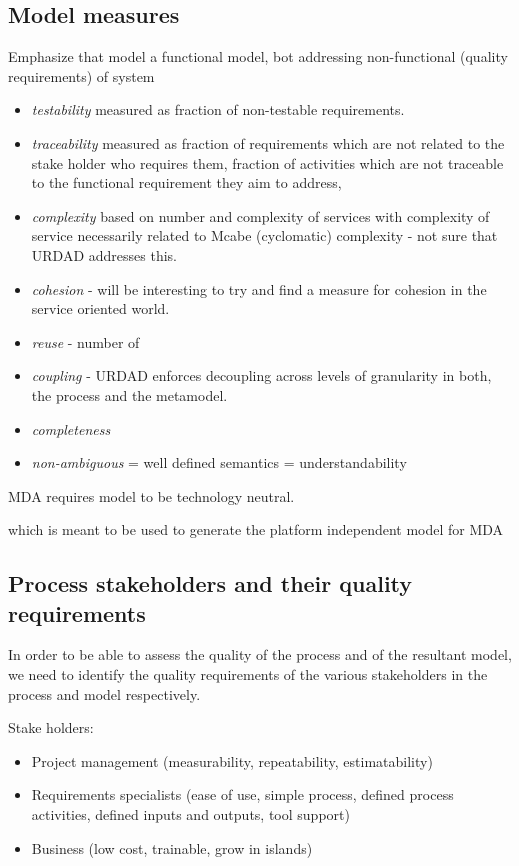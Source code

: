 \subsection{Model measures}
Emphasize that model a functional model, bot addressing non-functional (quality requirements) of system


\begin{itemize}
  \item \emph{testability} measured as fraction of non-testable requirements.
  \item \emph{traceability} measured as fraction of requirements which are not related to the stake holder who requires them, fraction of activities which are not traceable to the functional requirement they aim to address, 
  \item \emph{complexity} based on number and complexity of services with complexity of service necessarily related to Mcabe (cyclomatic) complexity - not sure that URDAD addresses this.
  \item \emph{cohesion} - will be interesting to try and find a measure for cohesion in the service oriented world.
  \item \emph{reuse} - number of
  \item \emph{coupling} - URDAD enforces decoupling across levels of granularity in both, the process and the metamodel.
  \item \emph{completeness}
  \item \emph{non-ambiguous} = well defined semantics = understandability
\end{itemize}


MDA requires model to be technology neutral.


which is meant to be used to generate the platform independent model for MDA

\subsection{Process stakeholders and their quality requirements}

In order to be able to assess the quality of the process and of the resultant model, we need to identify the quality requirements of the various stakeholders in the process and model respectively.


\cite{berard_what_1995}

Stake holders:
\begin{itemize}
  \item Project management (measurability, repeatability, estimatability)
  \item Requirements specialists (ease of use, simple process, defined process activities, defined inputs and outputs, tool support)
  \item Business (low cost, trainable, grow in islands)
\end{itemize}


